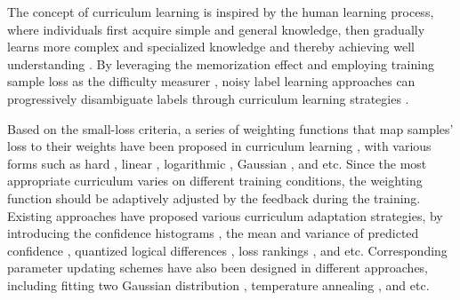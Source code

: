 \documentclass[letterpaper]{article} %
\begin{document}
  The concept of curriculum learning is inspired by the human learning process, where individuals first acquire simple and general knowledge, then gradually learns more complex and specialized knowledge and thereby achieving well understanding \cite{Curriculum-learning-2009}. 
  By leveraging the memorization effect \cite{a-closer-look} and employing training sample loss as the difficulty measurer \cite{Survey-curriculum-learning}, noisy label learning approaches can progressively disambiguate labels through curriculum learning strategies \cite{MentorNet}. 


  Based on the small-loss criteria, a series of weighting functions that map samples' loss to their weights have been proposed in curriculum learning \cite{Survey-curriculum-learning}, with various forms such as hard \cite{kumar2010self}, linear \cite{Easy-samples-first}, logarithmic \cite{Easy-samples-first}, Gaussian \cite{SoftMatch}, and etc. Since the most appropriate curriculum  varies on different training conditions, the weighting function should be adaptively adjusted by the feedback during the training. 
  Existing approaches have proposed various curriculum adaptation strategies, by introducing the confidence histograms \cite{CLC}, the mean and variance of predicted confidence \cite{SoftMatch}, quantized logical differences \cite{DynaCor}, loss rankings \cite{UNM}, and etc. Corresponding parameter updating schemes have also been designed in different approaches, including fitting two Gaussian distribution \cite{CLC}, temperature annealing \cite{Dash}, and etc.
\end{document}
